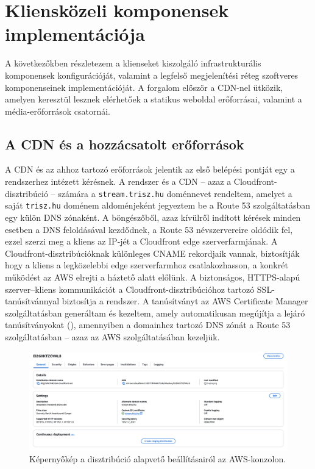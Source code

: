 \chapter{Kliensközeli komponensek implementációja}

A következőkben részletezem a klienseket kiszolgáló infrastrukturális komponensek konfigurációját, valamint a legfelső megjelenítési réteg szoftveres komponenseinek implementációját. A forgalom először a CDN-nel ütközik, amelyen keresztül lesznek elérhetőek a statikus weboldal erőforrásai, valamint a média-erőforrások csatornái.

\section{A CDN és a hozzácsatolt erőforrások}

A CDN és az ahhoz tartozó erőforrások jelentik az első belépési pontját egy a rendszerhez intézett kérésnek. A rendszer és a CDN -- azaz a Cloudfront-disztribúció -- számára a \verb|stream.trisz.hu| doménnevet rendeltem, amelyet a saját \verb|trisz.hu| doménem aldoménjeként jegyeztem be a Route 53 szolgáltatásban egy külön DNS zónaként. A böngészőből, azaz kívülről indított kérések minden esetben a DNS feloldásával kezdődnek, a Route 53 névszervereire oldódik fel, ezzel szerzi meg a kliens az IP-jét a Cloudfront edge szerverfarmjának. A Cloudfront-disztribúcióknak különleges CNAME rekordjaik vannak, biztosítják hogy a kliens a legközelebbi edge szerverfarmhoz csatlakozhasson, a konkrét működést az AWS elrejti a háztető alatt előlünk. A biztonságos, HTTPS-alapú szerver--kliens kommunikációt a Cloudfront-disztribúcióhoz tartozó SSL-tanúsítvánnyal biztosítja a rendszer. A tanúsítványt az AWS Certificate Manager szolgáltatásban generáltam és kezeltem, amely automatikusan megújítja a lejáró tanúsítványokat (), amennyiben a domainhez tartozó DNS zónát a Route 53 szolgáltatásban -- azaz az AWS szolgáltatásában kezeljük.

\begin{figure}[ht]
  \centering
  \includegraphics[width=150mm, keepaspectratio]{figures/distro_main.png}
  \caption{Képernyőkép a disztribúció alapvető beállításairól az AWS-konzolon.}
  \label{fig:distro}
\end{figure}

